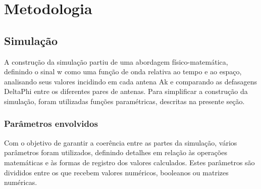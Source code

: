 \chapter{Metodologia}

\section{Simulação}




A construção da simulação partiu de uma abordagem físico-matemática, definindo o sinal \ac{w} como uma função de onda relativa ao tempo e ao espaço, analisando seus valores incidindo em cada antena \ac{Ak} e comparando as defasagens \ac{DeltaPhi} entre os diferentes pares de antenas.
Para simplificar a construção da simulação, foram utilizadas funções paramétricas, descritas na presente seção.

\subsection{Parâmetros envolvidos}

Com o objetivo de garantir a coerência entre as partes da simulação, vários parâmetros foram utilizados, definindo detalhes em relação às operações matemáticas e às formas de registro dos valores calculados.
Estes parâmetros são divididos entre os que recebem valores numéricos, booleanos ou matrizes numéricas.

